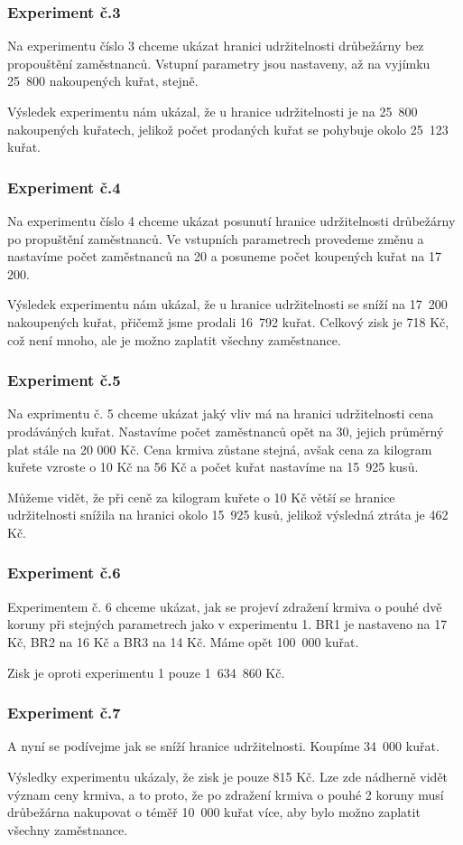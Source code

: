 \documentclass[a4paper,10pt]{article}
\begin{document}
\subsubsection{Experiment č.3}\label{ex3}
Na experimentu číslo 3 chceme ukázat hranici udržitelnosti drůbežárny bez propouštění
zaměstnanců.
Vstupní parametry jsou nastaveny, až na vyjímku 25~800 nakoupených kuřat, stejně.
\par
Výsledek experimentu nám ukázal, že u hranice udržitelnosti je na 25~800 nakoupených
kuřatech, jelikož počet prodaných kuřat se pohybuje okolo 25~123 kuřat.
\subsubsection{Experiment č.4}
Na experimentu číslo 4 chceme ukázat posunutí hranice udržitelnosti drůbežárny po propuštění
zaměstnanců.
Ve vstupních parametrech provedeme změnu a nastavíme počet zaměstnanců na 20 a posuneme 
počet koupených kuřat na 17 200.
\par
Výsledek experimentu nám ukázal, že u hranice udržitelnosti se sníží na 17~200 nakoupených
kuřat, přičemž jsme prodali 16~792 kuřat. Celkový zisk je 718 Kč, což není mnoho, ale je možno
zaplatit všechny zaměstnance.
\subsubsection{Experiment č.5}
Na exprimentu č. 5 chceme ukázat jaký vliv má na hranici udržitelnosti cena prodáváných kuřat.
Nastavíme počet zaměstnanců opět na 30, jejich průměrný plat stále na 20 000 Kč. Cena krmiva zůstane stejná,
avšak cena za kilogram kuřete vzroste o 10 Kč na 56 Kč a počet kuřat nastavíme na 15~925 kusů.
\par
Můžeme vidět, že při ceně za kilogram kuřete o 10 Kč větší se hranice udržitelnosti snížila na hranici okolo 15~925 kusů,
jelikož výsledná ztráta je 462 Kč.
\subsubsection{Experiment č.6}
Experimentem č. 6 chceme ukázat, jak se projeví zdražení krmiva o pouhé dvě koruny při stejných parametrech jako 
v experimentu 1. BR1 je nastaveno na 17 Kč, BR2 na 16 Kč a BR3 na 14 Kč. Máme opět 100~000 kuřat.
\par
Zisk je oproti experimentu 1 pouze 1~634~860 Kč.
\subsubsection{Experiment č.7}
A nyní se podívejme jak se sníží hranice udržitelnosti. Koupíme 34~000 kuřat.
\par
Výsledky experimentu ukázaly, že zisk je pouze 815 Kč. Lze zde nádherně vidět význam ceny krmiva, a to proto,
že po zdražení krmiva o pouhé 2 koruny musí drůbežárna nakupovat o téměř
10~000 kuřat více, aby bylo možno zaplatit všechny zaměstnance.
\end{document}

